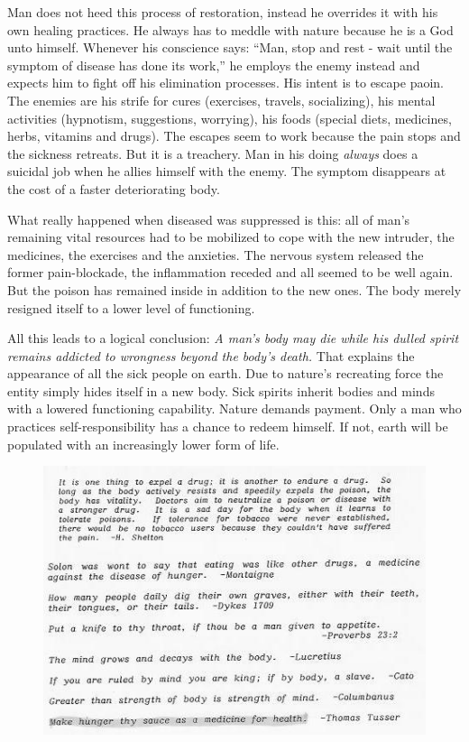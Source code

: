\documentclass[12pt,letterpaper]{article}
\begin{document}
Man does not heed this process of restoration, instead he overrides it
with his own healing practices. He always has to meddle with nature
because he is a God unto himself. Whenever his conscience says: ``Man,
stop and rest - wait until the symptom of disease has done its work,''
he employs the enemy instead and expects him to fight off his
elimination processes. His intent is to escape paoin. The enemies are
his strife for cures (exercises, travels, socializing), his mental
activities (hypnotism, suggestions, worrying), his foods (special
diets, medicines, herbs, vitamins and drugs). The escapes seem to work
because the pain stops and the sickness retreats. But it is a
treachery. Man in his doing \emph{always} does a suicidal job when he
allies himself with the enemy. The symptom disappears at the cost of a
faster deteriorating body.

What really happened when diseased was suppressed is this: all of
man's remaining vital resources had to be mobilized to cope with the
new intruder, the medicines, the exercises and the anxieties. The
nervous system released the former pain-blockade, the inflammation
receded and all seemed to be well again. But the poison has remained
inside in addition to the new ones. The body merely resigned itself to
a lower level of functioning.

All this leads to a logical conclusion: \emph{A man's body may die
while his dulled spirit remains addicted to wrongness beyond the
body's death.} That explains the appearance of all the sick people on
earth. Due to nature's recreating force the entity simply hides itself
in a new body. Sick spirits inherit bodies and minds with a lowered
functioning capability. Nature demands payment. Only a man who
practices self-responsibility has a chance to redeem himself. If not,
earth will be populated with an increasingly lower form of life.

\begin{figure} \centering
  \includegraphics[width=\textwidth]{p22quotes.jpg}
\end{figure}
\end{document}
